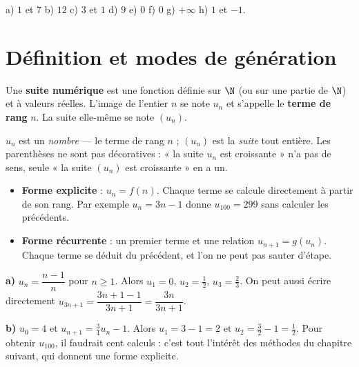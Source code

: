 \begin{corrige}[automatismes]
a) $1$ et $7$ \quad b) $12$ \quad c) $3$ et $1$ \quad d) $9$ \quad
e) $0$ \quad f) $0$ \quad g) $+\infty$ \quad h) $1$ et $-1$.
\end{corrige}

\section{Définition et modes de génération}

\begin{definition}
Une \textbf{suite numérique} est une fonction définie sur $\N$ (ou sur une
partie de $\N$) et à valeurs réelles. L'image de l'entier $n$ se note
$u_{n}$ et s'appelle le \textbf{terme de rang} $n$. La suite elle-même se
note $\left(u_{n}\right)$.
\end{definition}

\begin{avertissement}
$u_{n}$ est un \emph{nombre} — le terme de rang $n$ ; $\left(u_{n}\right)$
est la \emph{suite} tout entière. Les parenthèses ne sont pas décoratives :
« la suite $u_{n}$ est croissante » n'a pas de sens, seule
« la suite $\left(u_{n}\right)$ est croissante » en a un.
\end{avertissement}

\begin{propriete}
\begin{itemize}[leftmargin=1.3em, itemsep=0.2em]
  \item \textbf{Forme explicite} : $u_{n} = f(n)$. Chaque terme se calcule
        directement à partir de son rang. Par exemple $u_{n} = 3n-1$ donne
        $u_{100} = 299$ sans calculer les précédents.
  \item \textbf{Forme récurrente} : un premier terme et une relation
        $u_{n+1} = g\!\left(u_{n}\right)$. Chaque terme se déduit du
        précédent, et l'on ne peut pas sauter d'étape.
\end{itemize}
\end{propriete}

\begin{exemple}
\textbf{a)} $u_{n} = \dfrac{n-1}{n}$ pour $n \geq 1$. Alors
$u_{1} = 0$, $u_{2} = \frac12$, $u_{3} = \frac23$. On peut aussi écrire
directement $u_{3n+1} = \dfrac{3n+1-1}{3n+1} = \dfrac{3n}{3n+1}$.

\textbf{b)} $u_{0} = 4$ et $u_{n+1} = \frac34u_{n}-1$. Alors
$u_{1} = 3-1 = 2$ et $u_{2} = \frac32-1 = \frac12$. Pour obtenir
$u_{100}$, il faudrait cent calculs : c'est tout l'intérêt des méthodes du
chapitre suivant, qui donnent une forme explicite.
\end{exemple}

